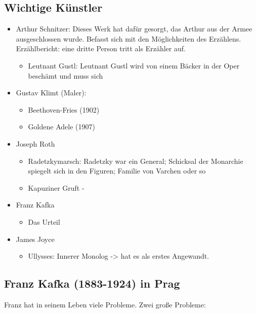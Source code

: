 \documentclass[12pt,a4paper]{article}
\begin{document}
\subsection{Wichtige Künstler}

\begin{itemize}
\item Arthur Schnitzer: Dieses Werk hat dafür gesorgt, das Arthur aus der Armee ausgeschlossen wurde. Befasst sich mit den Möglichkeiten des Erzählens. Erzählbericht: eine dritte Person tritt als Erzähler auf.
	\begin{itemize}
	\item Leutnant Gustl: Leutnant Gustl wird von einem Bäcker in der Oper beschämt und muss sich
	\end{itemize}
\item Gustav Klimt (Maler):
	\begin{itemize}
	\item Beethoven-Fries (1902)
	\item Goldene Adele (1907)
	\end{itemize}
\item Joseph Roth
	\begin{itemize}
		\item Radetzkymarsch: Radetzky war ein General; Schicksal der Monarchie spiegelt sich in den Figuren; Familie von Varchen oder so
	\item Kapuziner Gruft - 
	\end{itemize}
\item Franz Kafka
	\begin{itemize}
	\item Das Urteil
	\end{itemize}
\end{itemize}
\begin{itemize}
\item James Joyce
	\begin{itemize}
	\item Ullysses: Innerer Monolog -> hat es als erstes Angewandt.
	\end{itemize}
\end{itemize}

\subsection{Franz Kafka (1883-1924) in Prag}

Franz hat in seinem Leben viele Probleme. Zwei große Probleme:
\end{document}
